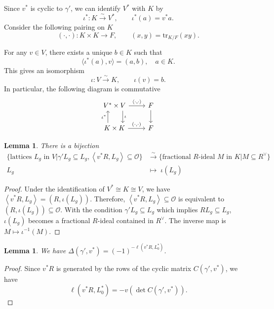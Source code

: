 \documentclass[a4paper]{amsart}
\newcommand{\CO}{{\mathcal {O}}} \newcommand{\CP}{{\mathcal {P}}}
\newcommand{\tr}{{\mathrm{tr}}}\newcommand{\tor}{{\mathrm{tor}}}
\newcommand{\lra}{\longrightarrow}\newcommand{\lla}{\longleftarrow}
\theoremstyle{plain}
\newtheorem{lem}[thm]{Lemma}  \newtheorem{prop}[thm]{Proposition}
\theoremstyle{remark} \newtheorem{remark}[thm]{Remark}
\theoremstyle{exercise} \newtheorem{exercise}[thm]{Exercise}
\theoremstyle{example} \newtheorem{example}[thm]{Example}
\theoremstyle{question} \newtheorem{question}[thm]{Question}
\theoremstyle{assumption} \newtheorem{assumption}[thm]{Assumption}
\numberwithin{equation}{section}
\begin{document}
Since $v^*$ is cyclic to $\gamma'$, we can identify $V^*$ with $K$ by
\[\iota^*:K\stackrel{\sim}{\longrightarrow} V^*,\qquad\iota^*(a)=v^*a.\]
Consider the following pairing on $K$ 
\[(\cdot,\cdot): K\times K\to F,\qquad(x,y)= \tr_{K/F}(xy).\]

For any $v\in V$, there exists a unique $b\in K$ such that 
\[\langle\iota^*(a),v\rangle=(a,b), \quad a \in K.\]
This gives an isomorphism  
\[\iota:V\stackrel{\sim}{\longrightarrow} K,\qquad\iota(v)=b.\]
In particular, the following diagram is commutative
\[
\begin{tikzcd}
V^*  \times  V \arrow[d,"\iota",shift left=5] \arrow[r, "{\langle \cdot,\cdot\rangle}"] & F \arrow[d] \\
K \arrow[u, "\iota^*",shift left=4]  \times  K \arrow[r, "{(\cdot,\cdot)}"]                                & F          
\end{tikzcd}
\]


\begin{lem}\label{lem-6}
There is a bijection
    \begin{align*}
        \{\text{lattices $L_g$ in $V$}|\gamma' L_g\subseteq L_g,\left\langle v^*R,L_g\right\rangle \subseteq\CO\}&\stackrel{\sim}{\lra}\{\text{fractional $R$-ideal $M$ in $K$}|M\subseteq R^\vee\}\\L_g&\longmapsto\;\iota(L_g)
    \end{align*}
\end{lem} 
\begin{proof}Under the identification of $V^*\cong K\cong V$, we have $\left\langle v^*R,L_g\right\rangle =(R,\iota(L_g))$. Therefore, $\left\langle v^*R,L_g\right\rangle \subseteq\CO$ is equivalent to $(R,\iota(L_g))\subseteq\CO$. With the condition $\gamma' L_g\subseteq L_g$ which implies $RL_g\subseteq L_g$, $\iota(L_g)$ becomes a fractional $R$-ideal contained in $R^\vee$. The inverse map is $M\mapsto\iota^{-1}(M)$.
\end{proof}


\begin{lem}\label{lem-7}
    We have $\Delta(\gamma',v^*) =(-1)^{-\ell(v^*R,L_0^*)}$.
\end{lem}
\begin{proof}
    Since $v^*R$ is generated by the rows of the cyclic matrix $C(\gamma',v^*)$, we have
    \[\ell(v^*R,L_0^*)=-v(\det C(\gamma',v^*)).\]
\end{proof}
\end{document}
